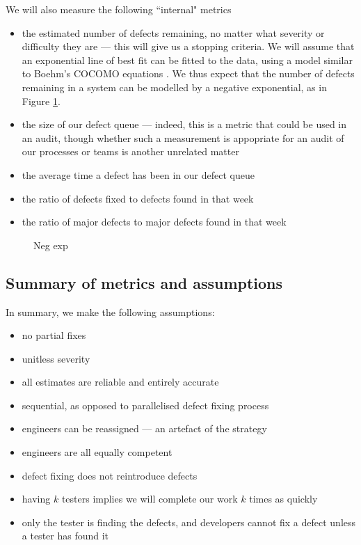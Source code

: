 We will also measure the following ``internal" metrics
\begin{itemize}
	\item the estimated number of defects remaining, no matter what severity or difficulty they are
--- this will give us a stopping criteria.
	We will assume that an exponential line of best fit can be fitted to the data, using a model
similar to Boehm's COCOMO equations \FIXME.
	We thus expect that the number of defects remaining in a system can be modelled by a negative
exponential, as in Figure \ref{negExp}.
	\item the size of our defect queue --- indeed, this is a metric that could be used in an audit,
though whether such a measurement is appopriate for an audit of our processes or teams is another
unrelated matter
	\item the average time a defect has been in our defect queue
	\item the ratio of defects fixed to defects found in that week
	\item the ratio of major defects to major defects found in that week
\end{itemize}

\begin{figure}[ht!]
	\caption{Neg exp \FIXME} \label{negExp}
\end{figure}

\subsection{Summary of metrics and assumptions}

In summary, we make the following assumptions:
\begin{itemize}
	\item no partial fixes
	\item unitless severity
	\item all estimates are reliable and entirely accurate
	\item sequential, as opposed to parallelised defect fixing process
	\item engineers can be reassigned --- an artefact of the strategy
	\item engineers are all equally competent
	\item defect fixing does not reintroduce defects
	\item having $k$ testers implies we will complete our work $k$ times as quickly
	\item only the tester is finding the defects, and developers cannot fix a defect unless a tester
has found it
\end{itemize}


